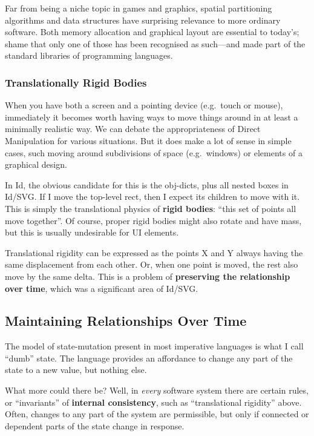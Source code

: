 Far from being a niche topic in games and graphics, spatial partitioning
algorithms and data structures have surprising relevance to more
ordinary software. Both memory allocation and graphical layout are
essential to today's; shame that only one of those has been recognised
as such---and made part of the standard libraries of programming
languages.

\hypertarget{translationally-rigid-bodies}{%
\subsubsection{Translationally Rigid
Bodies}\label{translationally-rigid-bodies}}

When you have both a screen and a pointing device (e.g.~touch or mouse),
immediately it becomes worth having ways to move things around in at
least a minimally realistic way. We can debate the appropriateness of
Direct Manipulation for various situations. But it does make a lot of
sense in simple cases, such moving around subdivisions of space
(e.g.~windows) or elements of a graphical design.

In Id{}, the obvious candidate for this is the obj-dicts, plus all
nested boxes in Id{}/SVG. If I move the top-level rect, then I expect
its children to move with it. This is simply the translational physics
of \textbf{rigid bodies}: ``this set of points all move together''. Of
course, proper rigid bodies might also rotate and have mass, but this is
usually undesirable for UI elements.

Translational rigidity can be expressed as the points X and Y always
having the same displacement from each other. Or, when one point is
moved, the rest also move by the same delta. This is a problem of
\textbf{preserving the relationship over time}, which was a significant
area of Id{}/SVG.

\hypertarget{maintaining-relationships-over-time}{%
\subsection{Maintaining Relationships Over
Time}\label{maintaining-relationships-over-time}}

The model of state-mutation present in most imperative languages is what
I call ``dumb'' state. The language provides an affordance to change any
part of the state to a new value, but nothing else.

What more could there be? Well, in \emph{every} software system there
are certain rules, or ``invariants'' of \textbf{internal consistency},
such as ``translational rigidity'' above. Often, changes to any part of
the system are permissible, but only if connected or dependent parts of
the state change in response.

